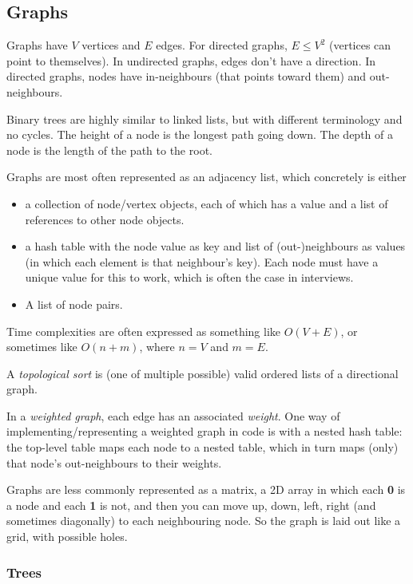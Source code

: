\documentclass[8pt, table, xcdraw]{article}%
\begin{document}
\subsection{Graphs}

Graphs have $V$ vertices and $E$ edges. For directed graphs, $E \leq V^2$ (vertices can point to themselves). In undirected graphs, edges don't have a direction. In directed graphs, nodes have in-neighbours (that points toward them) and out-neighbours.

Binary trees are highly similar to linked lists, but with different terminology and no cycles. The height of a node is the longest path going down. The depth of a node is the length of the path to the root.

Graphs are most often represented as an adjacency list, which concretely is either

\begin{itemize}
    \item a collection of node/vertex objects, each of which has a value and a list of references to other node objects.
    \item a hash table with the node value as key and list of (out-)neighbours as values (in which each element is that neighbour's key). Each node must have a unique value for this to work, which is often the case in interviews.
    \item A list of node pairs.
\end{itemize}

Time complexities are often expressed as something like $O(V + E)$, or sometimes like $O(n + m)$, where $n = V$ and $m = E$.

A \emph{topological sort} is (one of multiple possible) valid ordered lists of a directional graph.

In a \emph{weighted graph}, each edge has an associated \emph{weight}. One way of implementing/representing a weighted graph in code is with a nested hash table: the top-level table maps each node to a nested table, which in turn maps (only) that node's out-neighbours to their weights.

Graphs are less commonly represented as a matrix, a 2D array in which each \textbf{0} is a node and each \textbf{1} is not, and then you can move up, down, left, right (and sometimes diagonally) to each neighbouring node. So the graph is laid out like a grid, with possible holes.

\subsubsection{Trees}
\end{document}
